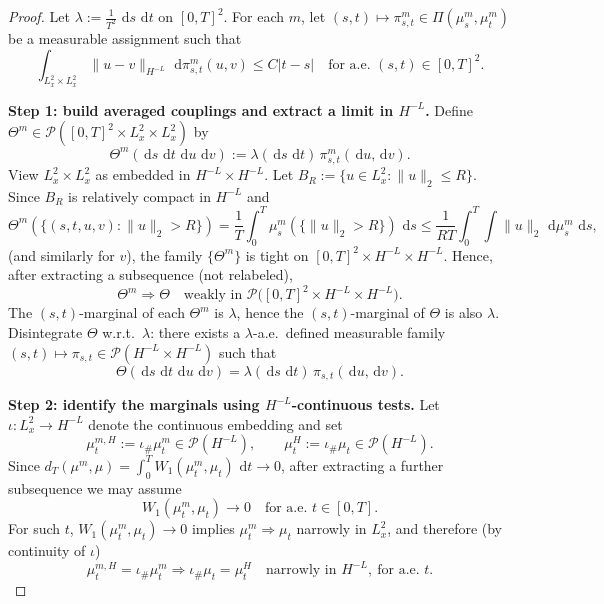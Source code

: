 \documentclass[10pt,a4paper]{amsart}
\newcommand{\Pcal}{\mathcal{P}}
\newcommand{\dd}{\,\mathrm{d}}
\begin{document}
\begin{proof}
Let $\lambda:=\frac{1}{T^2}\,\dd s\,\dd t$ on $[0,T]^2$.
For each $m$, let $(s,t)\mapsto\pi^m_{s,t}\in\Pi(\mu^m_s,\mu^m_t)$ be a measurable assignment such that
\[
\int_{L^2_x\times L^2_x}\|u-v\|_{H^{-L}}\,\dd\pi^m_{s,t}(u,v)\le C|t-s|
\quad\text{for a.e.\ }(s,t)\in[0,T]^2.
\]

\smallskip
\noindent\textbf{Step 1: build averaged couplings and extract a limit in $H^{-L}$.}
Define $\Theta^m\in\Pcal([0,T]^2\times L^2_x\times L^2_x)$ by
\[
\Theta^m(\dd s\,\dd t\,\dd u\,\dd v)
:=\lambda(\dd s\,\dd t)\,\pi^m_{s,t}(\dd u,\dd v).
\]
View $L^2_x\times L^2_x$ as embedded in $H^{-L}\times H^{-L}$.
Let $B_R:=\{u\in L^2_x:\|u\|_2\le R\}$. Since $B_R$ is relatively compact in $H^{-L}$ and
\[
\Theta^m(\{(s,t,u,v):\|u\|_2>R\})
=\frac1T\int_0^T \mu^m_s(\{\|u\|_2>R\})\,\dd s
\le \frac{1}{RT}\int_0^T\int\|u\|_2\,\dd\mu^m_s\,\dd s,
\]
(and similarly for $v$), the family $\{\Theta^m\}$ is tight on $[0,T]^2\times H^{-L}\times H^{-L}$.
Hence, after extracting a subsequence (not relabeled),
\[
\Theta^m\Rightarrow\Theta
\quad\text{weakly in }\Pcal\big([0,T]^2\times H^{-L}\times H^{-L}\big).
\]
The $(s,t)$-marginal of each $\Theta^m$ is $\lambda$, hence the $(s,t)$-marginal of $\Theta$ is also $\lambda$.
Disintegrate $\Theta$ w.r.t.\ $\lambda$:
there exists a $\lambda$-a.e.\ defined measurable family $(s,t)\mapsto\pi_{s,t}\in\Pcal(H^{-L}\times H^{-L})$ such that
\[
\Theta(\dd s\,\dd t\,\dd u\,\dd v)=\lambda(\dd s\,\dd t)\,\pi_{s,t}(\dd u,\dd v).
\]

\smallskip
\noindent\textbf{Step 2: identify the marginals using $H^{-L}$-continuous tests.}
Let $\iota:L^2_x\to H^{-L}$ denote the continuous embedding and set
\[
\mu^{m,H}_t:=\iota_\#\mu^m_t\in\Pcal(H^{-L}),
\qquad
\mu^{H}_t:=\iota_\#\mu_t\in\Pcal(H^{-L}).
\]
Since $d_T(\mu^m,\mu)=\int_0^T W_1(\mu^m_t,\mu_t)\,\dd t\to0$, after extracting a further subsequence we may assume
\[
W_1(\mu^m_t,\mu_t)\to0 \quad\text{for a.e.\ }t\in[0,T].
\]
For such $t$, $W_1(\mu^m_t,\mu_t)\to0$ implies $\mu^m_t\Rightarrow\mu_t$ narrowly in $L^2_x$, and therefore (by continuity of $\iota$)
\[
\mu^{m,H}_t=\iota_\#\mu^m_t \Rightarrow \iota_\#\mu_t=\mu^H_t
\quad\text{narrowly in }H^{-L},\ \text{for a.e.\ }t.
\]


\end{proof}
\end{document}
